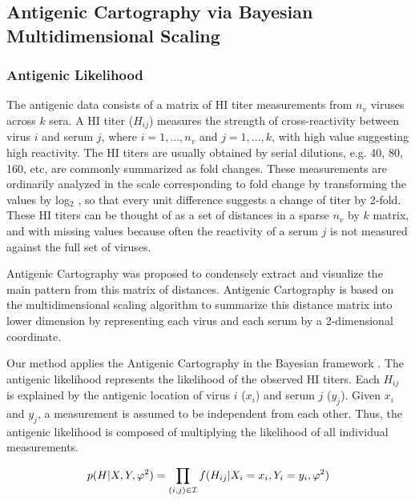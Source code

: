 \documentclass[11pt,oneside,letterpaper]{article}
\newcommand{\mdssd}{\varphi}						%
\begin{document}
\subsection*{Antigenic Cartography via Bayesian Multidimensional Scaling}



\subsubsection*{Antigenic Likelihood }


The antigenic data consists of a matrix of HI titer measurements from $n_v$ viruses across $k$ sera.  
A HI titer ($H_{ij}$) measures the strength of cross-reactivity between virus $i$ and serum $j$, where $i=1, ...,  n_v$ and $j=1,...,k$, with high value suggesting high reactivity. 
The HI titers are usually obtained by serial dilutions, e.g. 40, 80, 160, etc, are commonly summarized as fold changes. These measurements are ordinarily analyzed in the scale corresponding to fold change by transforming the values by log$_2$ \cite{smith_mapping_2004, bedford_integrating_2014}, so that every unit difference suggests a change of titer by 2-fold. 
These HI titers can be thought of as a set of distances in a sparse $n_v$ by $k$ matrix, and with missing values because often the reactivity of a serum $j$ is not measured against the full set of viruses.
	
Antigenic Cartography was proposed \cite{smith_mapping_2004} to condensely extract and visualize the main pattern from this matrix of distances. 
Antigenic Cartography is based on the multidimensional scaling algorithm to summarize this distance matrix into lower dimension by representing each virus and each serum by a 2-dimensional coordinate. 

Our method applies the Antigenic Cartography in the Bayesian framework \cite{bedford_integrating_2014}. 
The antigenic likelihood represents the likelihood of the observed HI titers. 
Each $H_{ij}$ is explained by the antigenic location of virus $i$ ($x_i$) and serum $j$ ($y_j$). 
Given $x_i$ and $y_j$, a measurement is assumed to be independent from each other. 
Thus, the antigenic likelihood is composed of multiplying the likelihood of all individual measurements.

\begin{equation}
 p(H|X, Y, \mdssd^2) = \prod_{(i,j) \in \cal I} f(H_{ij} |  X_i  = x_i, Y_i = y_i,\mdssd^2) 
\end{equation}
\end{document}
